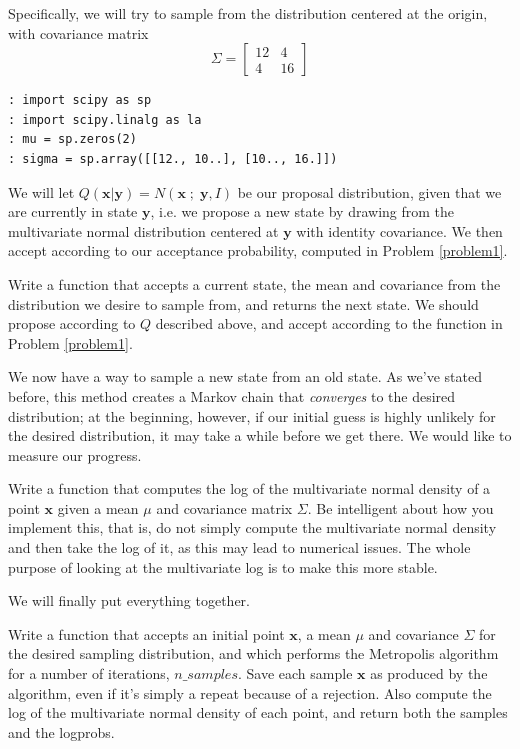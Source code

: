 Specifically, we will try to sample from the distribution centered at the origin, with covariance matrix
\begin{equation*}
\Sigma = \left[ \begin{array}{cc} 12 & 4 \\ 4 & 16 \end{array} \right]
\end{equation*}

\begin{lstlisting}
: import scipy as sp
: import scipy.linalg as la
: mu = sp.zeros(2)
: sigma = sp.array([[12., 10..], [10.., 16.]])
\end{lstlisting}

We will let $Q(\mathbf{x} | \mathbf{y}) = N(\mathbf{x} \; ; \; \mathbf{y}, I)$ be our proposal distribution, given that we are currently in state $\mathbf{y}$, i.e. we propose a new state by drawing from the multivariate normal distribution centered at $\mathbf{y}$ with identity covariance. We then accept according to our acceptance probability, computed in Problem \ref{problem1}.

\begin{problem}
Write a function that accepts a current state, the mean and covariance from the distribution we desire to sample from, and returns the next state. We should propose according to $Q$ described above, and accept according to the function in Problem \ref{problem1}.
\end{problem}

We now have a way to sample a new state from an old state. As we've stated before, this method creates a Markov chain that \emph{converges} to the desired distribution; at the beginning, however, if our initial guess is highly unlikely for the desired distribution, it may take a while before we get there. We would like to measure our progress.

\begin{problem}
Write a function that computes the log of the multivariate normal density of a point $\mathbf{x}$ given a mean $\mu$ and covariance matrix $\Sigma$. Be intelligent about how you implement this, that is, do not simply compute the multivariate normal density and then take the log of it, as this may lead to numerical issues. The whole purpose of looking at the multivariate log is to make this more stable.
\end{problem}

We will finally put everything together.

\begin{problem}
Write a function that accepts an initial point $\mathbf{x}$, a mean $\mu$ and covariance $\Sigma$ for the desired sampling distribution, and which performs the Metropolis algorithm for a number of iterations, $n\_samples$. Save each sample $\mathbf{x}$ as produced by the algorithm, even if it's simply a repeat because of a rejection. Also compute the log of the multivariate normal density of each point, and return both the samples and the logprobs.
\end{problem}

